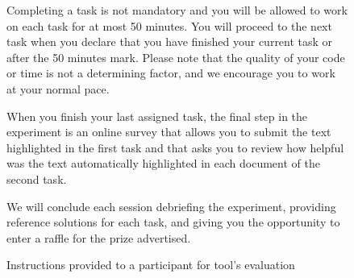 \begin{figure}
\begin{mdframed}[backgroundcolor=gray!05]
\begin{footnotesize}
Completing a task is not mandatory and you will be allowed to work on each task for at most 50 minutes. You will proceed to the next task when you declare that you have finished your current task or after the 50 minutes mark. Please note that the quality of your code or time is not a determining factor, and we encourage you to work at your normal pace.  \medskip

When you finish your last assigned task, the final step in the experiment is an online survey that allows you to submit the text highlighted in the first task and that asks you to review how helpful was the text automatically highlighted in each document of the second task. \medskip

We will conclude each session debriefing the experiment, providing reference solutions for each task, and giving you the opportunity to enter a raffle for the prize advertised.




\end{footnotesize}
\end{mdframed}
\caption{Instructions provided to a participant for \acs{tool}'s evaluation}
\end{figure}

\vfill
